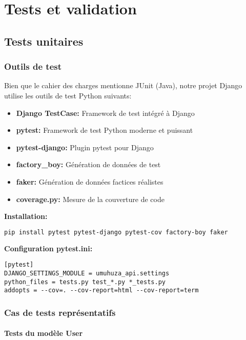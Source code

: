 \chapter{Tests et validation}

\section{Tests unitaires}

\subsection{Outils de test}

Bien que le cahier des charges mentionne JUnit (Java), notre projet Django utilise les outils de test Python suivants:

\begin{itemize}
    \item \textbf{Django TestCase:} Framework de test intégré à Django
    \item \textbf{pytest:} Framework de test Python moderne et puissant
    \item \textbf{pytest-django:} Plugin pytest pour Django
    \item \textbf{factory\_boy:} Génération de données de test
    \item \textbf{faker:} Génération de données factices réalistes
    \item \textbf{coverage.py:} Mesure de la couverture de code
\end{itemize}

\textbf{Installation:}
\begin{lstlisting}[language=bash]
pip install pytest pytest-django pytest-cov factory-boy faker
\end{lstlisting}

\textbf{Configuration pytest.ini:}
\begin{lstlisting}[caption=pytest.ini]
[pytest]
DJANGO_SETTINGS_MODULE = umuhuza_api.settings
python_files = tests.py test_*.py *_tests.py
addopts = --cov=. --cov-report=html --cov-report=term
\end{lstlisting}

\subsection{Cas de tests représentatifs}

\subsubsection{Tests du modèle User}

